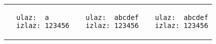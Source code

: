 \documentclass[]{article}
\begin{document}
\begin{enumerate}
  \noindent
  \begin{tabular}{lll}
  \begin{lstlisting}
  ulaz:  a
  izlaz: 123456
  \end{lstlisting}&
  \begin{lstlisting}
  ulaz:  abcdef
  izlaz: 123456
  \end{lstlisting}&
  \begin{lstlisting}
  ulaz:  abcdef
  izlaz: 123456
  \end{lstlisting}
  \end{tabular}
\end{enumerate}
\end{document}
